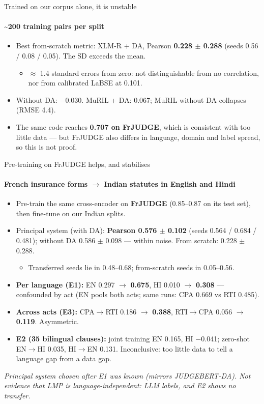 \documentclass[aspectratio=169,11pt]{beamer}
\newcommand{\slidenote}[1]{\vfill\parbox{0.9\textwidth}{\scriptsize\itshape\color{flag}#1}\par}
\begin{document}
\begin{frame}{Trained on our corpus alone, it is unstable}
\framesubtitle{\textasciitilde{}200 training pairs per split}
\small
\begin{itemize}
\item Best from-scratch metric: XLM-R + DA, Pearson \textbf{0.228 \ensuremath{\pm} 0.288} (seeds 0.56 / 0.08 / 0.05). The SD exceeds the mean.
\begin{itemize}\small
\item \ensuremath{\approx} 1.4 standard errors from zero: not distinguishable from no correlation, nor from calibrated LaBSE at 0.101.
\end{itemize}
\item Without DA: \ensuremath{-}0.030. MuRIL + DA: 0.067; MuRIL without DA collapses (RMSE 4.4).
\item The same code reaches \textbf{0.707 on FrJUDGE}, which is consistent with too little data — but FrJUDGE also differs in language, domain and label spread, so this is not proof.
\end{itemize}
\end{frame}

\begin{frame}{Pre-training on FrJUDGE helps, and stabilises}
\framesubtitle{French insurance forms \ensuremath{\rightarrow} Indian statutes in English and Hindi}
\footnotesize
\begin{itemize}
\item Pre-train the same cross-encoder on \textbf{FrJUDGE} (0.85–0.87 on its test set), then fine-tune on our Indian splits.
\item Principal system (with DA): \textbf{Pearson 0.576 \ensuremath{\pm} 0.102} (seeds 0.564 / 0.684 / 0.481); without DA 0.586 \ensuremath{\pm} 0.098 — within noise. From scratch: 0.228 \ensuremath{\pm} 0.288.
\begin{itemize}\footnotesize
\item Transferred seeds lie in 0.48–0.68; from-scratch seeds in 0.05–0.56.
\end{itemize}
\item \textbf{Per language (E1):} EN 0.297 \ensuremath{\rightarrow} \textbf{0.675}, HI 0.010 \ensuremath{\rightarrow} \textbf{0.308} — confounded by act (EN pools both acts; same runs: CPA 0.669 vs RTI 0.485).
\item \textbf{Across acts (E3):} CPA\ensuremath{\rightarrow}RTI 0.186 \ensuremath{\rightarrow} \textbf{0.388}, RTI\ensuremath{\rightarrow}CPA 0.056 \ensuremath{\rightarrow} \textbf{0.119}. Asymmetric.
\item \textbf{E2 (35 bilingual clauses):} joint training EN 0.165, HI \ensuremath{-}0.041; zero-shot EN\ensuremath{\rightarrow}HI 0.035, HI\ensuremath{\rightarrow}EN 0.131. Inconclusive: too little data to tell a language gap from a data gap.
\end{itemize}
\slidenote{Principal system chosen after E1 was known (mirrors JUDGEBERT-DA). Not evidence that LMP is language-independent: LLM labels, and E2 shows no transfer.}
\end{frame}
\end{document}
